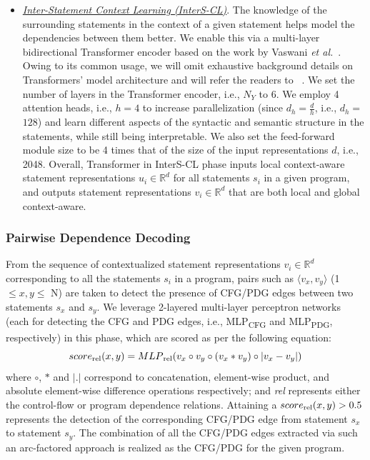 \begin{itemize}[leftmargin=*, listparindent=\parindent, parsep=0pt, itemsep=\topsep]
    \item \underline{\textit{Inter-Statement Context Learning (InterS-CL)}}. The knowledge of the surrounding statements in the context of a given statement helps \tool model the dependencies between them better. We enable this via a multi-layer bidirectional Transformer encoder based on the work by Vaswani {\em et al.}~\cite{Vaswani-2017}. Owing to its common usage, we will omit exhaustive background details on Transformers' model architecture and will refer the readers to ~\cite{Vaswani-2017}. We set the number of layers in the Transformer encoder, i.e., $N_Y$ to 6. We employ 4 attention heads, i.e., $h$$=$$4$ to increase parallelization (since $d_h$$=$$\frac{d}{h}$, i.e., $d_h$$=$$128$) and learn different aspects of the syntactic and semantic structure in the statements, while still being interpretable. We also set the feed-forward module size to be 4 times that of the size of the input representations $d$, i.e., 2048. Overall, Transformer in InterS-CL phase inputs local context-aware statement representations $u_i \in \mathbb{R}^d$ for all statements $s_i$ in a given program, and outputs statement representations $v_i \in \mathbb{R}^d$ that are both local and global context-aware.
\end{itemize}

\subsubsection{Pairwise Dependence Decoding}
From the sequence of contextualized statement representations $v_i \in\mathbb{R}^d$ corresponding to all the statements $s_i$ in a program, pairs such as $\langle v_x, v_y \rangle$ (1$\leq x, y\leq$ N) are taken to detect the presence of CFG/PDG edges between two statements $s_x$ and $s_y$. We leverage 2-layered multi-layer perceptron networks (each for detecting the CFG and PDG edges, i.e., MLP\textsubscript{CFG} and MLP\textsubscript{PDG}, respectively) in this phase, which are scored as per the following equation:
\begin{equation}
\centering
    score\textsubscript{rel}(x, y) = MLP\textsubscript{rel}(v_x \circ v_y \circ (v_x * v_y) \circ |v_x - v_y|) \nonumber
\end{equation}
where $\circ$, $*$ and $|.|$ correspond to concatenation, element-wise
product, and absolute element-wise difference operations respectively;
and \textit{rel} represents either the control-flow or program
dependence relations. 
Attaining a $score\textsubscript{rel}(x, y) >
0.5$ represents the detection of the corresponding CFG/PDG edge from
statement $s_x$ to statement $s_y$. The combination of all the CFG/PDG
edges extracted via such an arc-factored approach is realized as the
CFG/PDG for the given program.

